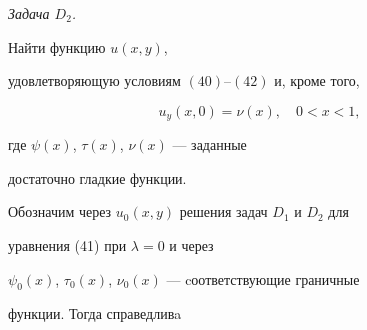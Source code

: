 {\it Задача $D_2$.} 


Найти функцию $u(x,y)$,


удовлетворяющую условиям $(40)$--$(42)$ и, кроме того,


$$


u_y(x,0)=\nu (x),\quad 0<x<1,


$$


где $\psi (x)$, $\tau (x)$, $\nu (x)$ --- заданные


достаточно гладкие функции.


\medskip





Обозначим через $u_0(x,y)$ решения задач $D_1$ и $D_2$ для


уравнения (41) при $\lambda =0$ и через


$\psi_0 (x)$, $\tau_0 (x)$, $\nu_0 (x)$ --- cоответствующие граничные 


функции. Тогда справедливa





